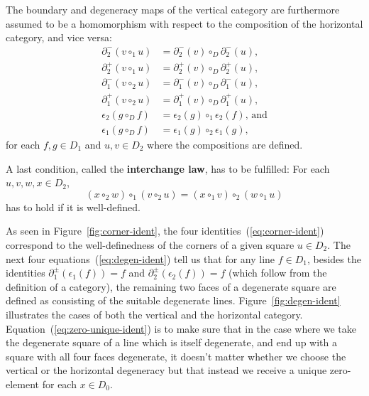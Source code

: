 \begin{defn}
The boundary and degeneracy maps of the vertical category are
furthermore assumed to be a homomorphism with respect to
the composition of the horizontal category, and vice versa:
\begin{equation} \label{eq:linear-ident}
\begin{aligned}
\partial^-_2(v \circ_1 u) &= \partial^-_2(v) \circ_D \partial^-_2(u)\text{,} \\
\partial^+_2(v \circ_1 u) &= \partial^+_2(v) \circ_D \partial^+_2(u)\text{,} \\
\partial^-_1(v \circ_2 u) &= \partial^-_1(v) \circ_D \partial^-_1(u)\text{,} \\
\partial^+_1(v \circ_2 u) &= \partial^+_1(v) \circ_D \partial^+_1(u)\text{,} \\
\epsilon_2(g \circ_D f) &= \epsilon_2(g) \circ_1 \epsilon_2(f)\text{, and} \\
\epsilon_1(g \circ_D f) &= \epsilon_1(g) \circ_2 \epsilon_1(g)\text{,}
\end{aligned}
\end{equation}
for each $f, g \in D_1$ and $u, v \in D_2$ where the compositions are defined.

A last condition, called the \textbf{interchange law}, has to be fulfilled:
For each $u, v, w, x \in D_2$,
\begin{equation} \label{eq:interchange}
(x \circ_2 w) \circ_1 (v \circ_2 u) = (x \circ_1 v) \circ_2 (w \circ_1 u)
\end{equation}
has to hold if it is well-defined.
\end{defn}

As seen in Figure~\ref{fig:corner-ident}, the four identities~(\ref{eq:corner-ident})
correspond to the well-definedness of the corners of a given square $u \in D_2$.
The next four equations~(\ref{eq:degen-ident}) tell us that for any line $f \in D_1$,
besides the identities
$\partial^\pm_1(\epsilon_1(f)) = f$ and
$\partial^\pm_2(\epsilon_2(f)) = f$ (which follow from the definition of a
category), the remaining two faces of a degenerate square are defined as
consisting of the suitable degenerate lines. Figure~\ref{fig:degen-ident}
illustrates the cases of both the vertical and the horizontal category.
Equation~(\ref{eq:zero-unique-ident}) is to make sure that in the case where we take the degenerate
square of a line which is itself degenerate, and end up with a square with all four
faces degenerate, it doesn't matter whether we choose the vertical or the horizontal
degeneracy but that instead we receive a unique zero-element for each $x \in D_0$.

